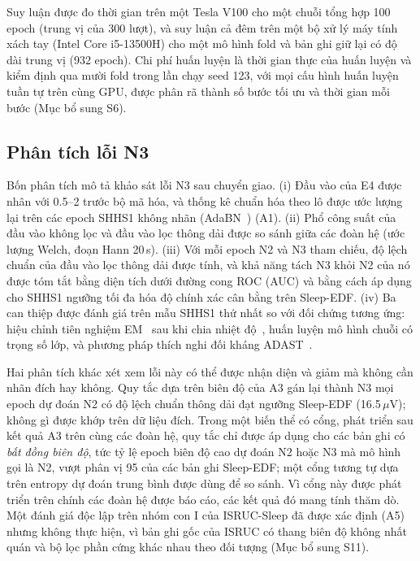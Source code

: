\documentclass[11pt,a4paper]{article}
\begin{document}
Suy luận được đo thời gian trên một Tesla V100 cho một chuỗi tổng hợp 100 epoch (trung vị của 300 lượt), và
suy luận cả đêm trên một bộ xử lý máy tính xách tay (Intel Core i5-13500H) cho một mô hình fold và bản ghi giữ
lại có độ dài trung vị (932 epoch). Chi phí huấn luyện là thời gian thực của huấn luyện và kiểm định qua mười
fold trong lần chạy seed 123, với mọi cấu hình huấn luyện tuần tự trên cùng GPU, được phân rã thành số bước tối
ưu và thời gian mỗi bước (Mục bổ sung S6).

\subsection{Phân tích lỗi N3}

Bốn phân tích mô tả khảo sát lỗi N3 sau chuyển giao. (i) Đầu vào của E4 được nhân với 0.5--2 trước bộ mã hóa,
và thống kê chuẩn hóa theo lô được ước lượng lại trên các epoch SHHS1 không nhãn (AdaBN~\cite{li2018adabn})
(A1). (ii) Phổ công suất của đầu vào không lọc và đầu vào lọc thông dải được so sánh giữa các đoàn hệ (ước
lượng Welch, đoạn Hann 20\,s). (iii) Với mỗi epoch N2 và N3 tham chiếu, độ lệch chuẩn của đầu vào lọc thông
dải được tính, và khả năng tách N3 khỏi N2 của nó được tóm tắt bằng diện tích dưới đường cong ROC (AUC) và bằng
cách áp dụng cho SHHS1 ngưỡng tối đa hóa độ chính xác cân bằng trên Sleep-EDF. (iv) Ba can thiệp được đánh giá
trên mẫu SHHS1 thứ nhất so với đối chứng tương ứng: hiệu chỉnh tiên nghiệm EM~\cite{saerens2002adjusting} sau
khi chia nhiệt độ~\cite{guo2017calibration}, huấn luyện mô hình chuỗi có trọng số lớp, và phương pháp thích
nghi đối kháng ADAST~\cite{eldele2023adast}.

Hai phân tích khác xét xem lỗi này có thể được nhận diện và giảm mà không cần nhãn đích hay không. Quy tắc dựa
trên biên độ của A3 gán lại thành N3 mọi epoch dự đoán N2 có độ lệch chuẩn thông dải đạt ngưỡng Sleep-EDF
(16.5\,$\mu$V); không gì được khớp trên dữ liệu đích. Trong một biến thể có cổng, phát triển sau kết quả A3
trên cùng các đoàn hệ, quy tắc chỉ được áp dụng cho các bản ghi có \emph{bất đồng biên độ}, tức tỷ lệ epoch
biên độ cao dự đoán N2 hoặc N3 mà mô hình gọi là N2, vượt phân vị 95 của các bản ghi Sleep-EDF; một cổng tương
tự dựa trên entropy dự đoán trung bình được dùng để so sánh. Vì cổng này được phát triển trên chính các đoàn
hệ được báo cáo, các kết quả đó mang tính thăm dò. Một đánh giá độc lập trên nhóm con I của ISRUC-Sleep đã được
xác định (A5) nhưng không thực hiện, vì bản ghi gốc của ISRUC có thang biên độ không nhất quán và bộ lọc phần
cứng khác nhau theo đối tượng (Mục bổ sung S11).
\end{document}

